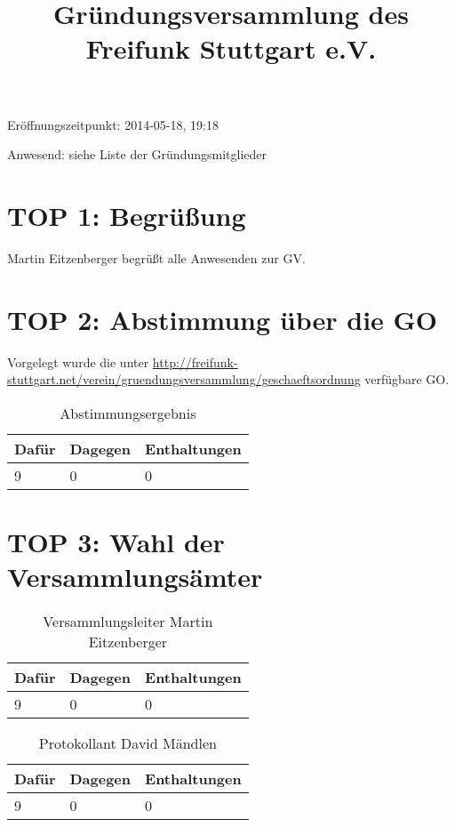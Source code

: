 \documentclass[a4paper]{scrartcl}
\title{Gründungsversammlung des Freifunk Stuttgart e.V.}
\begin{document}
\maketitle

\tableofcontents

\clearpage

\listoftables

\clearpage

Eröffnungszeitpunkt: 2014-05-18, 19:18

Anwesend: siehe Liste der Gründungsmitglieder

\section{TOP 1: Begrüßung}
Martin Eitzenberger begrüßt alle Anwesenden zur GV.

\section{TOP 2: Abstimmung über die GO}
Vorgelegt wurde die unter \url{http://freifunk-stuttgart.net/verein/gruendungsversammlung/geschaeftsordnung} verfügbare GO.

\begin{table}[h]
\begin{tabularx}{\textwidth}{XXX}
Dafür & Dagegen & Enthaltungen\\
\toprule
9 & 0 & 0\\
\end{tabularx}
\caption{Abstimmungsergebnis}
\end{table}

\clearpage

\section{TOP 3: Wahl der Versammlungsämter}
\begin{table}[h]
\begin{tabularx}{\textwidth}{XXX}
Dafür & Dagegen & Enthaltungen\\
\toprule
9 & 0 & 0\\
\end{tabularx}
\caption{Versammlungsleiter Martin Eitzenberger}
\end{table}

\begin{table}[h]
\begin{tabularx}{\textwidth}{XXX}
Dafür & Dagegen & Enthaltungen\\
\toprule
9 & 0 & 0\\
\end{tabularx}
\caption{Protokollant David Mändlen}
\end{table}
\end{document}
